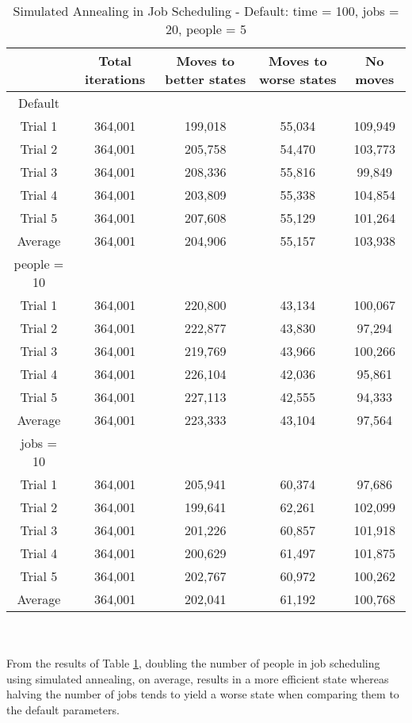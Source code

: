 \documentclass[11pt]{article}
\begin{document}
\begin{table}[htpb]
  \centering
  \caption{Simulated Annealing in Job Scheduling - Default: time = 100, jobs = 20, people = 5}
    \begin{tabular}{|c|c|c|c|c|}
    \hline
     & \textbf{Total iterations} & \textbf{Moves to better states} & \textbf{Moves to worse states} & \textbf{No moves} \\
       \hline
    Default &       &       &       &  \\
           \hline

    Trial 1 & 364,001 & 199,018 & 55,034 & 109,949 \\
    Trial 2 & 364,001 & 205,758 & 54,470 & 103,773 \\
    Trial 3 & 364,001 & 208,336 & 55,816 & 99,849 \\
    Trial 4 & 364,001 & 203,809 & 55,338 & 104,854 \\
    Trial 5 & 364,001 & 207,608 & 55,129 & 101,264 \\
    Average & 364,001 & 204,906 & 55,157 & 103,938 \\
        \hline
    people = 10 &       &       &       &  \\
           \hline

    Trial 1 & 364,001 & 220,800 & 43,134 & 100,067 \\
    Trial 2 & 364,001 & 222,877 & 43,830 & 97,294 \\
    Trial 3 & 364,001 & 219,769 & 43,966 & 100,266 \\
    Trial 4 & 364,001 & 226,104 & 42,036 & 95,861 \\
    Trial 5 & 364,001 & 227,113 & 42,555 & 94,333 \\
    Average & 364,001 & 223,333 & 43,104 & 97,564 \\
        \hline
    jobs = 10 &       &       &       &  \\
           \hline

    Trial 1 & 364,001 & 205,941 & 60,374 & 97,686 \\
    Trial 2 & 364,001 & 199,641 & 62,261 & 102,099 \\
    Trial 3 & 364,001 & 201,226 & 60,857 & 101,918 \\
    Trial 4 & 364,001 & 200,629 & 61,497 & 101,875 \\
    Trial 5 & 364,001 & 202,767 & 60,972 & 100,262 \\
    Average & 364,001 & 202,041 & 61,192 & 100,768 \\
    \hline
    \end{tabular}%
  \label{simulated_annealing}%
  \\~\\
  \vspace*{5mm}
  From the results of Table \ref{simulated_annealing}, doubling the number of people in job scheduling using simulated annealing, on average, results in a more efficient state whereas halving the number of jobs tends to yield a worse state when comparing them to the default parameters.
\end{table}%
\end{document}
